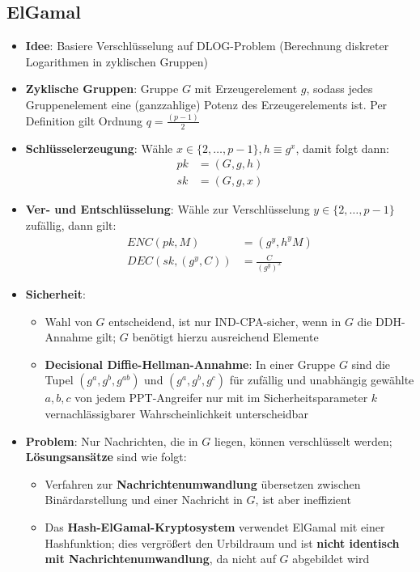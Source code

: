 \subsection{ElGamal}%
\label{asver:sub:elgamal}

\begin{itemize}
	\item \textbf{Idee}: Basiere Verschlüsselung auf DLOG-Problem (Berechnung diskreter Logarithmen in zyklischen Gruppen)
	\item \textbf{Zyklische Gruppen}: Gruppe $G$ mit Erzeugerelement $g$, sodass jedes Gruppenelement eine (ganzzahlige) Potenz des Erzeugerelements ist. Per Definition gilt Ordnung $q = \frac{(p - 1)}{2}$
	\item \textbf{Schlüsselerzeugung}: Wähle $x \in \{2, \dots, p - 1\}, h \equiv g^x$, damit folgt dann:
	\begin{align*}
		pk &= (G, g, h)\\
		sk &= (G, g, x)
	\end{align*}
	\item \textbf{Ver- und Entschlüsselung}: Wähle zur Verschlüsselung $y \in \{2, \dots, p - 1\}$ zufällig, dann gilt:
	\begin{align*}
		ENC(pk, M) &= (g^y, h^yM)\\
		DEC(sk, (g^y, C)) &= \frac{C}{(g^y)^x}
	\end{align*}
	\item \textbf{Sicherheit}:
	\begin{itemize}
		\item Wahl von $G$ entscheidend, ist nur IND-CPA-sicher, wenn in $G$ die DDH-Annahme gilt; $G$ benötigt hierzu ausreichend Elemente
		\item \textbf{Decisional Diffie-Hellman-Annahme}: In einer Gruppe $G$ sind die Tupel $(g^a, g^b, g^{ab})$ und $(g^a, g^b, g^c)$ für zufällig und unabhängig gewählte $a, b, c$ von jedem PPT-Angreifer nur mit im Sicherheitsparameter $k$ vernachlässigbarer Wahrscheinlichkeit unterscheidbar
	\end{itemize}
	\item \textbf{Problem}: Nur Nachrichten, die in $G$ liegen, können verschlüsselt werden; \textbf{Lösungsansätze} sind wie folgt:
	\begin{itemize}
		\item Verfahren zur \textbf{Nachrichtenumwandlung} übersetzen zwischen Binärdarstellung und einer Nachricht in $G$, ist aber ineffizient
		\item Das \textbf{Hash-ElGamal-Kryptosystem} verwendet ElGamal mit einer Hashfunktion; dies vergrößert den Urbildraum und ist \textbf{nicht identisch mit Nachrichtenumwandlung}, da nicht auf $G$ abgebildet wird
	\end{itemize}
\end{itemize}
